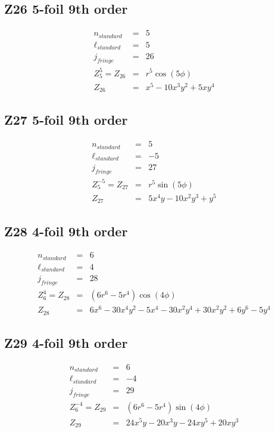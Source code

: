 \documentclass[10pt]{article}
\begin{document}
  \subsection{Z26 5-foil 9th order}
    \begin{subequations}
    \begin{eqnarray}
        n_{standard} &=&5\\
        \ell_{standard} &=&5\\
        j_{fringe} &=&26\\
        Z_{5}^{5} = Z_{26} &=& r^{5} \cos{\left(5 \phi \right)}\\
        Z_{26} &=& x^{5} - 10 x^{3} y^{2} + 5 x y^{4}
    \end{eqnarray}
    \end{subequations}
  \subsection{Z27 5-foil 9th order}
    \begin{subequations}
    \begin{eqnarray}
        n_{standard} &=&5\\
        \ell_{standard} &=&-5\\
        j_{fringe} &=&27\\
        Z_{5}^{-5} = Z_{27} &=& r^{5} \sin{\left(5 \phi \right)}\\
        Z_{27} &=& 5 x^{4} y - 10 x^{2} y^{3} + y^{5}
    \end{eqnarray}
    \end{subequations}
  \subsection{Z28 4-foil 9th order}
    \begin{subequations}
    \begin{eqnarray}
        n_{standard} &=&6\\
        \ell_{standard} &=&4\\
        j_{fringe} &=&28\\
        Z_{6}^{4} = Z_{28} &=& \left(6 r^{6} - 5 r^{4}\right) \cos{\left(4 \phi \right)}\\
        Z_{28} &=& 6 x^{6} - 30 x^{4} y^{2} - 5 x^{4} - 30 x^{2} y^{4} + 30 x^{2} y^{2} + 6 y^{6} - 5 y^{4}
    \end{eqnarray}
    \end{subequations}
  \subsection{Z29 4-foil 9th order}
    \begin{subequations}
    \begin{eqnarray}
        n_{standard} &=&6\\
        \ell_{standard} &=&-4\\
        j_{fringe} &=&29\\
        Z_{6}^{-4} = Z_{29} &=& \left(6 r^{6} - 5 r^{4}\right) \sin{\left(4 \phi \right)}\\
        Z_{29} &=& 24 x^{5} y - 20 x^{3} y - 24 x y^{5} + 20 x y^{3}
    \end{eqnarray}
    \end{subequations}
\end{document}
